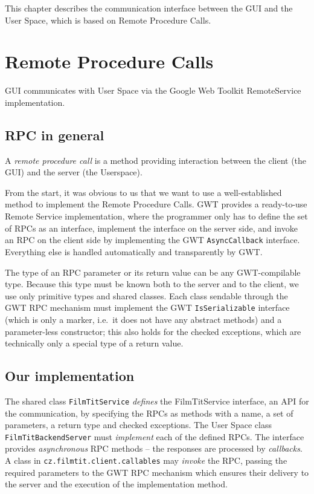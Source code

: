 \label{chap:communication}
\label{sec:communication}

This chapter describes the communication interface between the GUI and the User Space, which is based on Remote Procedure Calls.

\section{Remote Procedure Calls}
\label{sec:rpc:rpc}

GUI communicates with User Space via the Google Web Toolkit RemoteService implementation.

\subsection{RPC in general}
A \emph{remote procedure call} is a method providing interaction between the client (the GUI) and the server (the Userspace).

From the start, it was obvious to us that we want to use a well-established method to implement the Remote Procedure Calls. GWT provides a ready-to-use Remote Service implementation, where the programmer only has to define the set of RPCs as an interface, implement the interface on the server side, and invoke an RPC on the client side by implementing the GWT {\tt AsyncCallback} interface.
Everything else is handled automatically and transparently by GWT.

The type of an RPC parameter or its return value can be any GWT-compilable type. Because this type must be known both to the server and to the client, we use only primitive types and shared classes. Each class sendable through the GWT RPC mechanism must implement the GWT {\tt IsSerializable} interface (which is only a marker, i.e.\ it does not have any abstract methods) and a parameter-less constructor; this also holds for the checked exceptions, which are technically only a special type of a return value.

\subsection{Our implementation}
The shared class {\tt FilmTitService} \emph{defines} the FilmTitService interface, an API for the communication, by specifying the RPCs as methods with a name, a set of parameters, a return type and checked exceptions. The User Space class {\tt FilmTitBackendServer} must \emph{implement} each of the defined RPCs. The interface provides \emph{asynchronous} RPC methods -- the responses are processed by \emph{callbacks}. A class in {\tt cz.filmtit.client.callables} may \emph{invoke} the RPC, passing the required parameters to the GWT RPC mechanism which ensures their delivery to the server and the execution of the implementation method.

